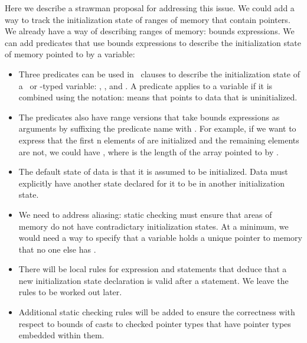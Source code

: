 Here we describe a strawman proposal for addressing this issue.  
We could add a way to track the initialization state of ranges of memory 
that contain pointers. We already have a way of 
describing ranges of memory: bounds expressions.  We can add
predicates that use bounds expressions to describe the initialization
state of memory pointed to by a variable:
\begin{itemize}
\item Three predicates can be used in \ clauses
to describe the initialization state of a \arrayptr\ or \ptr-typed variable:
, , and .
A predicate applies to a variable if it is combined using the \code{:}
notation:   means that  points to data
that is uninitialized.
\item The predicates also have range versions that take bounds expressions
as arguments by suffixing the predicate name with .  For example, 
if we want to express that the first n elements of  are initialized
and the remaining elements are not, we could have
  
, where  is 
the length of the array pointed to by .
\item The default state of data is that it is assumed to be initialized.
Data must explicitly have another state declared for it to be in another
initialization state.
\item We need to address aliasing: static checking must ensure
that areas of memory do not have contradictary initialization states.
At a minimum, we would need a way to specify that a variable holds
a unique pointer to memory that no one else has \cite{Jim2002}.
\item There will be local rules for expression and statements that deduce that a new
initialization state declaration is valid after a statement.  We leave 
the rules to be worked out later.
\item Additional static checking rules will be added to ensure the
correctness with respect to bounds of casts to checked pointer types that have pointer types embedded
within them.
\end{itemize}

